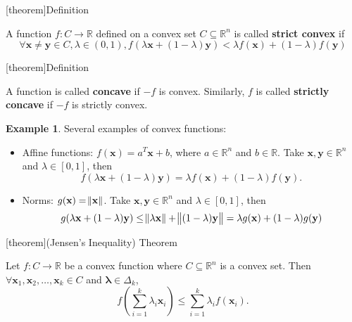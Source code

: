 \documentclass[12pt]{report}
\theoremstyle{definition}
\begin{document}
[theorem]{Definition}
\begin{strict convex function}
    A function $f:C\rightarrow\mathbb{R}$ defined on a convex set
    $C\subseteq\mathbb{R}^{n}$ is called \textbf{strict convex} if
    \[
        \forall\mathbf{x}\neq\mathbf{y}\in C,\lambda\in(0,1),
        f(\lambda\mathbf{x}+(1-\lambda)\mathbf{y})<
        \lambda f(\mathbf{x})+(1-\lambda)f(\mathbf{y})
    \]
\end{strict convex function}

[theorem]{Definition}
\begin{concavity}
    A function is called \textbf{concave} if $-f$ is convex. Similarly, $f$ is
    called \textbf{strictly concave} if $-f$ is strictly convex.
\end{concavity}

\newtheorem{convex function example}[theorem]{Example}
\begin{convex function example}
    Several examples of convex functions:
    \begin{itemize}
        \item Affine functions: $f(\mathbf{x})=a^T\mathbf{x}+b$, where
            $a\in\mathbb{R}^n$ and $b\in\mathbb{R}$. Take
            $\mathbf{x},\mathbf{y}\in\mathbb{R}^{n}$ and $\lambda\in[0,1]$, then
            \[
                f(\lambda\mathbf{x}+(1-\lambda)\mathbf{y})=
                \lambda f(\mathbf{x})+(1-\lambda)f(\mathbf{y}).
            \]
        \item Norms: $g(\mathbf{x})=\norm{\mathbf{x}}$. Take
            $\mathbf{x},\mathbf{y}\in\mathbb{R}^{n}$ and $\lambda\in[0,1]$, then
            \[
                g(\lambda\mathbf{x}+(1-\lambda)\mathbf{y})\le
                \norm{\lambda\mathbf{x}}+\norm{(1-\lambda)\mathbf{y}}=
                \lambda g(\mathbf{x})+(1-\lambda)g(\mathbf{y})
            \]
    \end{itemize} 
\end{convex function example}

[theorem]{(Jensen's Inequality) Theorem}
\begin{jensen's inequality}
    Let $f:C\rightarrow\mathbb{R}$ be a convex function where
    $C\subseteq\mathbb{R}^{n}$ is a convex set. Then $\forall
    \mathbf{x}_1,\mathbf{x}_2,\ldots,\mathbf{x}_k\in C$ and
    $\pmb{\lambda}\in\Delta_k$,
    \[
        f\left(\sum_{i=1}^{k} \lambda_i\mathbf{x}_i\right)\le
        \sum_{i=1}^{k} \lambda_i f(\mathbf{x}_i).
    \]
\end{jensen's inequality}
\end{document}

